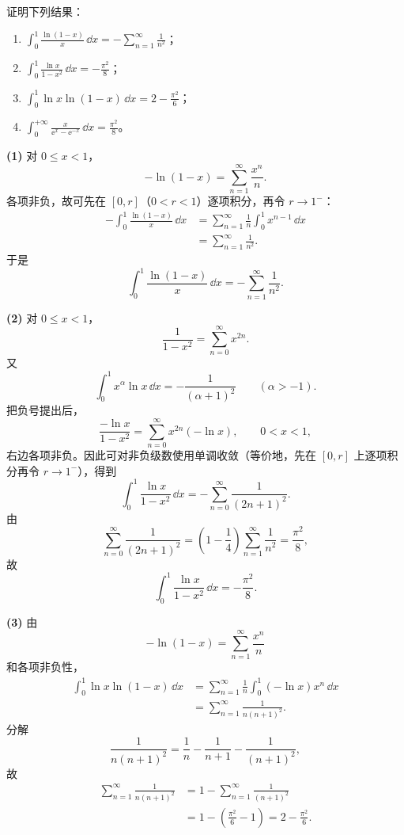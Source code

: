 \begin{xexercise}[3]
证明下列结果：
\begin{enumerate}[label=(\arabic*)]
\item $\displaystyle \int_0^1\frac{\ln(1-x)}x\,\dd x=-\sum_{n=1}^{\infty}\frac1{n^2}$；
\item $\displaystyle \int_0^1\frac{\ln x}{1-x^2}\,\dd x=-\frac{\pi^2}{8}$；
\item $\displaystyle \int_0^1\ln x\ln(1-x)\,\dd x=2-\frac{\pi^2}{6}$；
\item $\displaystyle \int_0^{+\infty}\frac{x}{\ee^x-\ee^{-x}}\,\dd x=\frac{\pi^2}{8}$。
\end{enumerate}
\end{xexercise}
\begin{xsolution}
\textbf{(1)}\quad
对 $0\leqslant x<1$，
\[
  -\ln(1-x)=\sum_{n=1}^{\infty}\frac{x^n}{n}.
\]
各项非负，故可先在 $[0,r]$（$0<r<1$）逐项积分，再令 $r\to1^-$：
\[
\begin{aligned}
  -\int_0^1\frac{\ln(1-x)}x\,\dd x
  &=\sum_{n=1}^{\infty}\frac1n\int_0^1x^{n-1}\,\dd x\\
  &=\sum_{n=1}^{\infty}\frac1{n^2}.
\end{aligned}
\]
于是
\[
  \int_0^1\frac{\ln(1-x)}x\,\dd x
  =-\sum_{n=1}^{\infty}\frac1{n^2}.
\]

\textbf{(2)}\quad
对 $0\leqslant x<1$，
\[
  \frac1{1-x^2}=\sum_{n=0}^{\infty}x^{2n}.
\]
又
\[
  \int_0^1x^{\alpha}\ln x\,\dd x=-\frac1{(\alpha+1)^2}\qquad(\alpha>-1).
\]
把负号提出后，
\[
  \frac{-\ln x}{1-x^2}=\sum_{n=0}^{\infty}x^{2n}(-\ln x),
  \qquad 0<x<1,
\]
右边各项非负。因此可对非负级数使用单调收敛（等价地，先在 $[0,r]$ 上逐项积分再令 $r\to1^-$），得到
\[
  \int_0^1\frac{\ln x}{1-x^2}\,\dd x
  =-\sum_{n=0}^{\infty}\frac1{(2n+1)^2}.
\]
由
\[
  \sum_{n=0}^{\infty}\frac1{(2n+1)^2}
  =\left(1-\frac14\right)\sum_{n=1}^{\infty}\frac1{n^2}
  =\frac{\pi^2}{8},
\]
故
\[
  \int_0^1\frac{\ln x}{1-x^2}\,\dd x=-\frac{\pi^2}{8}.
\]

\textbf{(3)}\quad
由
\[
  -\ln(1-x)=\sum_{n=1}^{\infty}\frac{x^n}{n}
\]
和各项非负性，
\[
\begin{aligned}
  \int_0^1\ln x\ln(1-x)\,\dd x
  &=\sum_{n=1}^{\infty}\frac1n\int_0^1(-\ln x)x^n\,\dd x\\
  &=\sum_{n=1}^{\infty}\frac1{n(n+1)^2}.
\end{aligned}
\]
分解
\[
  \frac1{n(n+1)^2}=\frac1n-\frac1{n+1}-\frac1{(n+1)^2},
\]
故
\[
\begin{aligned}
  \sum_{n=1}^{\infty}\frac1{n(n+1)^2}
  &=1-\sum_{n=1}^{\infty}\frac1{(n+1)^2}\\
  &=1-\left(\frac{\pi^2}{6}-1\right)
  =2-\frac{\pi^2}{6}.
\end{aligned}
\]


\end{xsolution}

